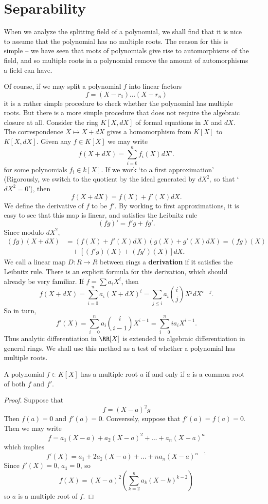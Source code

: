 \section{Separability}

When we analyze the splitting field of a polynomial, we shall find that it is nice to assume that the polynomial has no multiple roots. The reason for this is simple -- we have seen that roots of polynomials give rise to automorphisms of the field, and so multiple roots in a polynomial remove the amount of automorphisms a field can have.

Of course, if we may split a polynomial $f$ into linear factors
%
\[ f = (X - r_1) \dots (X - r_n) \]
%
it is a rather simple procedure to check whether the polynomial has multiple roots. But there is a more simple procedure that does not require the algebraic closure at all. Consider the ring $K[X,dX]$ of formal equations in $X$ and $dX$. The correspondence $X \mapsto X + dX$ gives a homomorphism from $K[X]$ to $K[X,dX]$. Given any $f \in K[X]$ we may write
%
\[ f(X + dX) = \sum_{i = 0}^n f_i(X) dX^i. \]
%
for some polynomials $f_i \in k[X]$. If we work `to a first approximation' (Rigorously, we switch to the quotient by the ideal generated by $dX^2$, so that `$dX^2 = 0$'), then
%
\[ f(X + dX) = f(X) + f'(X) dX. \]
%
We define the derivative of $f$ to be $f'$. By working to first approximations, it is easy to see that this map is linear, and satisfies the Leibnitz rule
%
\[ (fg)' = f'g + fg'. \]
%
Since modulo $dX^2$,
%
\begin{align*}
    (fg)(X + dX) &= (f(X) + f'(X)dX)(g(X) + g'(X)dX) = (fg)(X)\\
    &\ \ \ \ + [(f'g)(X) + (fg')(X)]dX.
\end{align*}
%
We call a linear map $D: R \to R$ between rings a {\bf derivation} if it satisfies the Leibnitz rule. There is an explicit formula for this derivation, which should already be very familiar. If $f = \sum a_i X^i$, then
%
\[ f(X + dX) = \sum_{i = 0}^n a_i (X + dX)^i = \sum_{j \leq i} a_i \binom{i}{j} X^j dX^{i-j}. \]
%
So in turn,
%
\[ f'(X) = \sum_{i = 0}^n a_i \binom{i}{i-1} X^{i-1} = \sum_{i=0}^n i a_i X^{i-1}. \]
%
Thus analytic differentiation in $\RR[X]$ is extended to algebraic differentiation in general rings. We shall use this method as a test of whether a polynomial has multiple roots.

\begin{prop}
    A polynomial $f \in K[X]$ has a multiple root $a$ if and only if $a$ is a common root of both $f$ and $f'$.
\end{prop}
\begin{proof}
    Suppose that
    \[ f = (X - a)^2 g \]
    Then $f(a) = 0$ and $f'(a) = 0$. Conversely, suppose that $f'(a) = f(a) = 0$. Then we may write
    \[ f = a_1 (X - a) + a_2 (X - a)^2 + \dots + a_n (X - a)^n \]
    which implies
    \[ f'(X) = a_1 + 2 a_2 (X - a) + \dots + n a_n (X - a)^{n-1} \]
    Since $f'(X) = 0$, $a_1 = 0$, so
    \[ f(X) = (X - a)^2 \left( \sum_{k = 2}^n a_k (X - k)^{k-2} \right) \]
    so $a$ is a multiple root of $f$.
\end{proof}


